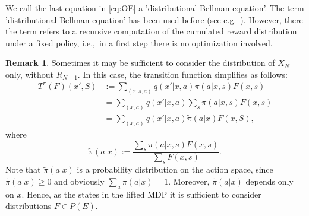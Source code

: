 \documentclass[reqno, 12pt]{amsart}%
\theoremstyle{definition}
\newtheorem{remark}[theorem]{Remark}
\numberwithin{equation}{section} \numberwithin{theorem}{section}
\begin{document}
We call the last equation in \eqref{eq:OE} 
a 'distributional Bellman equation'. The term 'distributional Bellman equation' has 
been used before (see e.g.\ \cite{bdr2023}). However, there the term refers to a recursive computation of the cumulated reward distribution under a fixed policy, i.e.,\ in a first step there is no optimization involved.


\begin{remark}\label{rem:onlyX}
    Sometimes it may be sufficient to consider the distribution of $X_N$ only, without $R_{N-1}.$ In this case,  the transition function simplifies as follows:
\begin{align*}
    T^\pi(F)(x',S) &:= \sum_{(x,s,a) }  q(x'|x,a)\pi(a|x,s) F(x,s)\\
    &= \sum_{(x,a) }  q(x'|x,a) \sum_s \pi(a|x,s) F(x,s)\\
    &=  \sum_{(x,a) }  q(x'|x,a)  \tilde\pi(a|x) F(x,S),
\end{align*} 
 where $$ \tilde \pi(a|x) := \frac{\sum_s \pi(a|x,s) F(x,s)}{\sum_s  F(x,s)}. $$ Note that $\tilde \pi(a|x)$ is a probability distribution on the action space, since $\tilde \pi(a|x) \ge 0$ and obviously $\sum_a \tilde \pi(a|x)=1.$  
 Moreover, $\tilde \pi(a|x)$ depends only on $x$.  Hence, as the states in the lifted MDP it is  sufficient to consider distributions $F\in P(E)$.
\end{remark}

\end{document}
